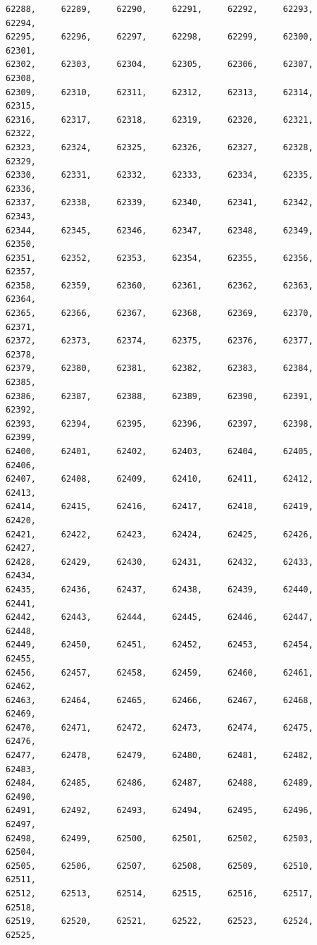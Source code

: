 \documentclass[a4paper,11pt]{report}
\begin{document}
\begin{verbatim}
62288,     62289,     62290,     62291,     62292,     62293,     62294,     
62295,     62296,     62297,     62298,     62299,     62300,     62301,     
62302,     62303,     62304,     62305,     62306,     62307,     62308,     
62309,     62310,     62311,     62312,     62313,     62314,     62315,     
62316,     62317,     62318,     62319,     62320,     62321,     62322,     
62323,     62324,     62325,     62326,     62327,     62328,     62329,     
62330,     62331,     62332,     62333,     62334,     62335,     62336,     
62337,     62338,     62339,     62340,     62341,     62342,     62343,     
62344,     62345,     62346,     62347,     62348,     62349,     62350,     
62351,     62352,     62353,     62354,     62355,     62356,     62357,     
62358,     62359,     62360,     62361,     62362,     62363,     62364,     
62365,     62366,     62367,     62368,     62369,     62370,     62371,     
62372,     62373,     62374,     62375,     62376,     62377,     62378,     
62379,     62380,     62381,     62382,     62383,     62384,     62385,     
62386,     62387,     62388,     62389,     62390,     62391,     62392,     
62393,     62394,     62395,     62396,     62397,     62398,     62399,     
62400,     62401,     62402,     62403,     62404,     62405,     62406,     
62407,     62408,     62409,     62410,     62411,     62412,     62413,     
62414,     62415,     62416,     62417,     62418,     62419,     62420,     
62421,     62422,     62423,     62424,     62425,     62426,     62427,     
62428,     62429,     62430,     62431,     62432,     62433,     62434,     
62435,     62436,     62437,     62438,     62439,     62440,     62441,     
62442,     62443,     62444,     62445,     62446,     62447,     62448,     
62449,     62450,     62451,     62452,     62453,     62454,     62455,     
62456,     62457,     62458,     62459,     62460,     62461,     62462,     
62463,     62464,     62465,     62466,     62467,     62468,     62469,     
62470,     62471,     62472,     62473,     62474,     62475,     62476,     
62477,     62478,     62479,     62480,     62481,     62482,     62483,     
62484,     62485,     62486,     62487,     62488,     62489,     62490,     
62491,     62492,     62493,     62494,     62495,     62496,     62497,     
62498,     62499,     62500,     62501,     62502,     62503,     62504,     
62505,     62506,     62507,     62508,     62509,     62510,     62511,     
62512,     62513,     62514,     62515,     62516,     62517,     62518,     
62519,     62520,     62521,     62522,     62523,     62524,     62525,     

\end{verbatim}
\end{document}
